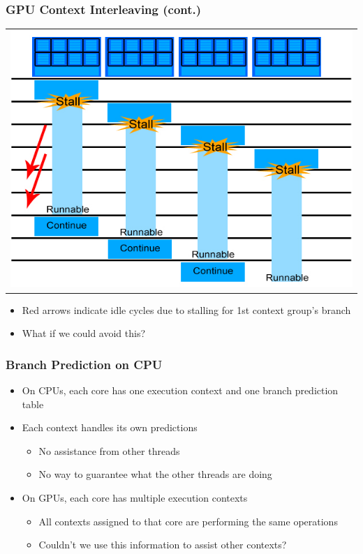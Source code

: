 \documentclass{beamer}
\begin{document}
\begin{frame}
	\frametitle{GPU Context Interleaving (cont.)}
	\begin{tabular}{c}
		\includegraphics[width=.75\textwidth]{GPU-context-interleaving-2.jpg}
	\end{tabular}
	\begin{itemize}
		\item Red arrows indicate idle cycles due to stalling for 1st context group's branch
		\item What if we could avoid this?
	\end{itemize}
\end{frame}

\begin{frame}
	\frametitle{Branch Prediction on CPU}
	\begin{itemize}
		\item On CPUs, each core has one execution context and one branch prediction table
		\item Each context handles its own predictions
		\begin{itemize}
			\item No assistance from other threads 
			\item No way to guarantee what the other threads are doing
		\end{itemize}
		\item On GPUs, each core has multiple execution contexts
		\begin{itemize}
			\item All contexts assigned to that core are performing the same operations
			\item Couldn't we use this information to assist other contexts?
		\end{itemize}
	\end{itemize}
\end{frame}
\end{document}
